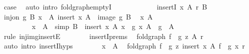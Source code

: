 \begin{isabellebody}
\ {\isacharquery}{\kern0pt}case\ \isamarkupfalse%
\ {\isacharparenleft}{\kern0pt}auto\ intro{\isacharcolon}{\kern0pt}\ fold{\isacharunderscore}{\kern0pt}graph{\isachardot}{\kern0pt}emptyI{\isacharparenright}{\kern0pt}\isanewline
\ \ \ \ \isamarkupfalse%
\isanewline
\ \ \ \ \ \ \isamarkupfalse%
\ {\isacharparenleft}{\kern0pt}insertI\ x\ A\ r\ B{\isacharparenright}{\kern0pt}\isanewline
\ \ \ \ \ \ \isamarkupfalse%
\ {\isacartoucheopen}inj{\isacharunderscore}{\kern0pt}on\ g\ B{\isacartoucheclose}\ {\isacartoucheopen}x\ {\isasymnotin}\ A{\isacartoucheclose}\ {\isacartoucheopen}insert\ x\ A\ {\isacharequal}{\kern0pt}\ image\ g\ B{\isacartoucheclose}\ \isamarkupfalse%
\ x{\isacharprime}{\kern0pt}\ A{\isacharprime}{\kern0pt}\isanewline
\ \ \ \ \ \ \ \ \ {\isachardoublequoteopen}x{\isacharprime}{\kern0pt}\ {\isasymnotin}\ A{\isacharprime}{\kern0pt}{\isachardoublequoteclose}\ \ {\isacharbrackleft}{\kern0pt}simp{\isacharbrackright}{\kern0pt}{\isacharcolon}{\kern0pt}\ {\isachardoublequoteopen}B\ {\isacharequal}{\kern0pt}\ insert\ x{\isacharprime}{\kern0pt}\ A{\isacharprime}{\kern0pt}{\isachardoublequoteclose}\ {\isachardoublequoteopen}x\ {\isacharequal}{\kern0pt}\ g\ x{\isacharprime}{\kern0pt}{\isachardoublequoteclose}\ {\isachardoublequoteopen}A\ {\isacharequal}{\kern0pt}\ g\ {\isacharbackquote}{\kern0pt}\ A{\isacharprime}{\kern0pt}{\isachardoublequoteclose}\isanewline
\ \ \ \ \ \ \ \ \isamarkupfalse%
\ {\isacharparenleft}{\kern0pt}rule\ inj{\isacharunderscore}{\kern0pt}img{\isacharunderscore}{\kern0pt}insertE{\isacharparenright}{\kern0pt}\isanewline
\ \ \ \ \ \ \isamarkupfalse%
\ insertI{\isachardot}{\kern0pt}prems\ \isamarkupfalse%
\ {\isachardoublequoteopen}fold{\isacharunderscore}{\kern0pt}graph\ {\isacharparenleft}{\kern0pt}f\ {\isasymcirc}\ g{\isacharparenright}{\kern0pt}\ z\ A{\isacharprime}{\kern0pt}\ r{\isachardoublequoteclose}\isanewline
\ \ \ \ \ \ \ \ \isamarkupfalse%
\ {\isacharparenleft}{\kern0pt}auto\ intro{\isacharcolon}{\kern0pt}\ insertI{\isachardot}{\kern0pt}hyps{\isacharparenright}{\kern0pt}\isanewline
\ \ \ \ \ \ \isamarkupfalse%
\ {\isacartoucheopen}x{\isacharprime}{\kern0pt}\ {\isasymnotin}\ A{\isacharprime}{\kern0pt}{\isacartoucheclose}\ \isamarkupfalse%
\ {\isachardoublequoteopen}fold{\isacharunderscore}{\kern0pt}graph\ {\isacharparenleft}{\kern0pt}f\ {\isasymcirc}\ g{\isacharparenright}{\kern0pt}\ z\ {\isacharparenleft}{\kern0pt}insert\ x{\isacharprime}{\kern0pt}\ A{\isacharprime}{\kern0pt}{\isacharparenright}{\kern0pt}\ {\isacharparenleft}{\kern0pt}{\isacharparenleft}{\kern0pt}f\ {\isasymcirc}\ g{\isacharparenright}{\kern0pt}\ x{\isacharprime}{\kern0pt}\ r{\isacharparenright}{\kern0pt}{\isachardoublequoteclose}\isanewline

\end{isabellebody}
